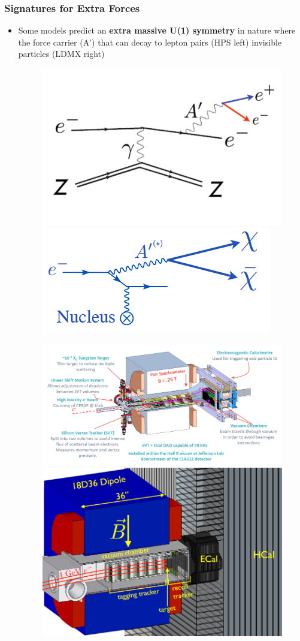 \documentclass{beamer}
\begin{document}
\begin{frame}
\frametitle{Signatures for Extra Forces}
\begin{itemize}
\item Some models predict an \textbf{extra massive U(1) symmetry} in nature where the force carrier (A') that can decay to lepton pairs (HPS left) invisible particles (LDMX right)
\begin{figure}
\includegraphics[width=0.30\linewidth]{figs/visible_decay.png}
\includegraphics[width=0.30\linewidth]{figs/invisible_decay.png}
\end{figure}
\begin{figure}
\includegraphics[width=0.60\linewidth]{figs/hps.png}
\includegraphics[width=0.45\linewidth]{figs/LDMX.png}
\end{figure}
\end{itemize}

\end{frame}

\end{document}
